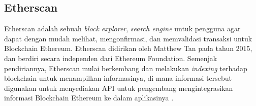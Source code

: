 \subsection{Etherscan}
\label{subsec:etherscan}

Etherscan adalah sebuah \textit{block explorer}, \textit{search engine} untuk pengguna agar dapat dengan mudah melihat, mengonfirmasi, dan memvalidasi transaksi untuk Blockchain Ethereum. Etherscan didirikan oleh Matthew Tan pada tahun 2015, dan berdiri secara independen dari Ethereum Foundation. Semenjak pendiriannya, Etherscan mulai berkembang dan melakukan \textit{indexing} terhadap blockchain untuk menampilkan informasinya, di mana informasi tersebut digunakan untuk menyediakan API untuk pengembang mengintegrasikan informasi Blockchain Ethereum ke dalam aplikasinya \parencite{etherscan2024}.